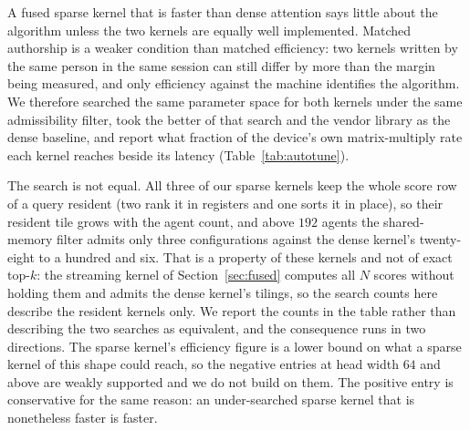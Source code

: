A fused sparse kernel that is faster than dense attention says little about the
algorithm unless the two kernels are equally well implemented. Matched authorship is a weaker condition than matched efficiency:
two kernels written by the same person in the same session can still differ by
more than the margin being measured, and only efficiency against the machine
identifies the algorithm. We therefore searched the same parameter space for
both kernels under the same admissibility filter, took the better of that search
and the vendor library as the dense baseline, and report what fraction of the
device's own matrix-multiply rate each kernel reaches beside its latency
(Table~\ref{tab:autotune}).

\begin{table}[t]
\centering\small
\caption{Both kernels searched over one parameter space --- query tile, key tile
or head chunk, warp count and pipeline depth --- under one shared-memory
admissibility filter, with the better of the search and the vendor library taken
as the dense baseline. The \emph{cfgs} columns are how many configurations each
search admitted; the sparse kernel must hold an $N$-wide score tile, so above
$192$ agents only three fit. Efficiency is executed arithmetic over elapsed time,
against the matrix-multiply rate the device attains in the same process. These
are the search session's own timings, taken configuration by configuration
rather than interleaved; the two search sessions measured peaks of $58$ and
$71$~TFLOP/s, so the efficiency columns are comparable within a row but not
across sessions. Every ratio elsewhere in the paper re-times the selected
configurations in an interleaved sweep.}
\label{tab:autotune}
\resizebox{\linewidth}{!}{}
\end{table}

The search is not equal. All three of our sparse kernels keep the whole score
row of a query resident (two rank it in registers and one sorts it in place),
so their resident tile grows with the agent count, and above $192$ agents
the shared-memory filter admits only three configurations against the dense
kernel's twenty-eight to a hundred and six. That is a property of these kernels and not
of exact top-$k$: the streaming kernel of Section~\ref{sec:fused} computes all
$N$ scores without holding them and admits the dense kernel's tilings, so the
search counts here describe the resident kernels only. We
report the counts in the table rather than describing the two searches as
equivalent, and the consequence runs in two directions. The sparse kernel's
efficiency figure is a lower bound on what a sparse kernel of this shape could
reach, so the negative entries at head width $64$ and above are weakly supported
and we do not build on them. The positive entry is conservative for the same
reason: an under-searched sparse kernel that is nonetheless faster is faster.

